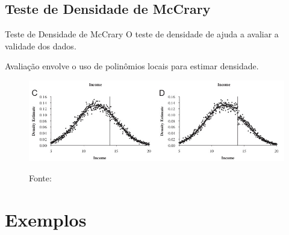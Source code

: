 \documentclass[aspectratio=1610, 10pt]{beamer}
\begin{document}
\subsection{Teste de Densidade de McCrary}
\begin{frame}{Teste de Densidade de McCrary}
    \justifying
    O teste de densidade de \cite{mccrary2008manipulation} ajuda a avaliar a validade dos dados.

    Avaliação envolve o uso de polinômios locais para estimar densidade.

    \begin{figure}
        \centering
        \includegraphics[width=\linewidth]{fig/McCraryDensityTest.jpg}

        \tiny{Fonte: \cite{cunningham2021causal}}
    \end{figure}
\end{frame}

\section{Exemplos}
\end{document}
